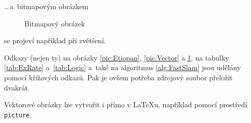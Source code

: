 \documentclass[a4paper, 11pt]{article}
\begin{document}
\begin{figure}[h]
\begin{center}
\end{center}
	\end{figure}
	
	\noindent \dots\,a~bitmapovým obrázkem
	\begin{figure}[h]
	\begin{center}
		\caption{Bitmapový obrázek}
		\label{pic:Bitmap}
	\end{center}
	\end{figure} 

\noindent se projeví například při zvětšení.

Odkazy (nejen ty) na obrázky \ref{pic:Etiopan}, \ref{pic:Vector} a \ref{pic:Bitmap}, na tabulky \ref{tab:ExRate} a~\ref{tab:Logic} a~také na algoritmus \ref{alg:FastSlam} jsou udělány pomocí křížových odkazů. Pak je ovšem potřeba zdrojový soubor přeložit dvakrát.

Vektorové obrázky lze vytvořit i přímo v \LaTeX u, například pomocí prostředí\texttt{ picture}.
\end{document}

